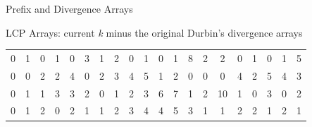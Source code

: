 \documentclass{beamer}
\begin{document}
\begin{frame}{Prefix and Divergence Arrays}
\begin{block}{LCP Arrays: current \textit{k} minus the original Durbin's
                    divergence arrays}
\begin{table}[H]
\begin{tabular}{c|c|c|c|c|c|c|c|c|c|c|c|c|c|c|c|c|c|c|c}
                    0 & 1 & 0 & 1 & 0 & 3 & 1 & 2 & 0 & 1 & 0 & 1 & 8 & 2 & 2 & 0 & 1 & 0
                                                                                                                                                                                                       & 1 & 5 \\
                    0 & 0 & 2 & 2 & 4 & 0 & 2 & 3 & 4 & 5 & 1 & 2 & 0 & 0 & 0 & 4 & 2 & 5
                                                                                                                                                                                                       & 4 & 3 \\
                    0 & 1 & 1 & 3 & 3 & 2 & 0 & 1 & 2 & 3 & 6 & 7 & 1 & 2 & 10 & 1 & 0 & 3
                                                                                                                                                                                                        & 0 & 2 \\
                    0 & 1 & 2 & 0 & 2 & 1 & 1 & 2 & 3 & 4 & 4 & 5 & 3 & 1 & 1 & 2 & 2 & 1
                                                                                                                                                                                                       & 2 & 1\\
                  \end{tabular}
                    \end{table}
                    \end{block}
                    \end{frame}
\end{document}
